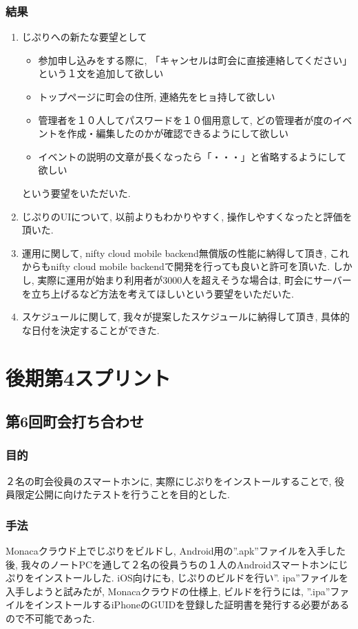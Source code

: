 \subsubsection{結果}
\begin{enumerate}
    \item じぷりへの新たな要望として
    \begin{itemize}
        \item 参加申し込みをする際に, 「キャンセルは町会に直接連絡してください」という１文を追加して欲しい
        \item トップページに町会の住所, 連絡先をヒョ持して欲しい
        \item 管理者を１０人してパスワードを１０個用意して, どの管理者が度のイベントを作成・編集したのかが確認できるようにして欲しい
        \item イベントの説明の文章が長くなったら「・・・」と省略するようにして欲しい
    \end{itemize}
    という要望をいただいた.
    \item じぷりのUIについて, 以前よりもわかりやすく, 操作しやすくなったと評価を頂いた.
    \item 運用に関して, nifty cloud mobile backend無償版の性能に納得して頂き, これからもnifty cloud mobile backendで開発を行っても良いと許可を頂いた.
    しかし, 実際に運用が始まり利用者が3000人を超えそうな場合は, 町会にサーバーを立ち上げるなど方法を考えてほしいという要望をいただいた.

    \item スケジュールに関して, 我々が提案したスケジュールに納得して頂き, 具体的な日付を決定することができた.
\end{enumerate}

\section{後期第4スプリント}
\subsection{第6回町会打ち合わせ}
\subsubsection{目的}
２名の町会役員のスマートホンに, 実際にじぷりをインストールすることで, 役員限定公開に向けたテストを行うことを目的とした.
\subsubsection{手法}
Monacaクラウド上でじぷりをビルドし, Android用の”.apk”ファイルを入手した後, 我々のノートPCを通して２名の役員うちの１人のAndroidスマートホンにじぷりをインストールした. iOS向けにも, じぷりのビルドを行い”.
ipa”ファイルを入手しようと試みたが, Monacaクラウドの仕様上, ビルドを行うには, ”.ipa”ファイルをインストールするiPhoneのGUIDを登録した証明書を発行する必要があるので不可能であった.

